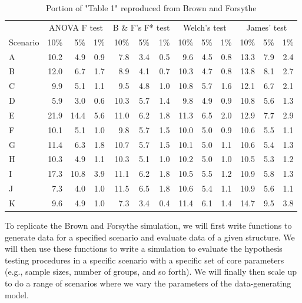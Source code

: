 \documentclass[
]{book}
\begin{document}
\begin{table}
\centering
\caption{\label{tab:BF-table1}Portion of "Table 1" reproduced from Brown and Forsythe}
\centering
\begin{tabular}[t]{l|r|r|r|r|r|r|r|r|r|r|r|r}
\hline
\multicolumn{1}{c|}{ } & \multicolumn{3}{c|}{ANOVA F test} & \multicolumn{3}{c|}{B \& F's F* test} & \multicolumn{3}{c|}{Welch's test} & \multicolumn{3}{c}{James' test} \\
\cline{2-4} \cline{5-7} \cline{8-10} \cline{11-13}
Scenario & 10\% & 5\% & 1\% & 10\% & 5\% & 1\% & 10\% & 5\% & 1\% & 10\% & 5\% & 1\%\\
\hline
A & 10.2 & 4.9 & 0.9 & 7.8 & 3.4 & 0.5 & 9.6 & 4.5 & 0.8 & 13.3 & 7.9 & 2.4\\
\hline
B & 12.0 & 6.7 & 1.7 & 8.9 & 4.1 & 0.7 & 10.3 & 4.7 & 0.8 & 13.8 & 8.1 & 2.7\\
\hline
C & 9.9 & 5.1 & 1.1 & 9.5 & 4.8 & 1.0 & 10.8 & 5.7 & 1.6 & 12.1 & 6.7 & 2.1\\
\hline
D & 5.9 & 3.0 & 0.6 & 10.3 & 5.7 & 1.4 & 9.8 & 4.9 & 0.9 & 10.8 & 5.6 & 1.3\\
\hline
E & 21.9 & 14.4 & 5.6 & 11.0 & 6.2 & 1.8 & 11.3 & 6.5 & 2.0 & 12.9 & 7.7 & 2.9\\
\hline
F & 10.1 & 5.1 & 1.0 & 9.8 & 5.7 & 1.5 & 10.0 & 5.0 & 0.9 & 10.6 & 5.5 & 1.1\\
\hline
G & 11.4 & 6.3 & 1.8 & 10.7 & 5.7 & 1.5 & 10.1 & 5.0 & 1.1 & 10.6 & 5.4 & 1.3\\
\hline
H & 10.3 & 4.9 & 1.1 & 10.3 & 5.1 & 1.0 & 10.2 & 5.0 & 1.0 & 10.5 & 5.3 & 1.2\\
\hline
I & 17.3 & 10.8 & 3.9 & 11.1 & 6.2 & 1.8 & 10.5 & 5.5 & 1.2 & 10.9 & 5.8 & 1.3\\
\hline
J & 7.3 & 4.0 & 1.0 & 11.5 & 6.5 & 1.8 & 10.6 & 5.4 & 1.1 & 10.9 & 5.6 & 1.1\\
\hline
K & 9.6 & 4.9 & 1.0 & 7.3 & 3.4 & 0.4 & 11.4 & 6.1 & 1.4 & 14.7 & 9.5 & 3.8\\
\hline
\end{tabular}
\end{table}

To replicate the Brown and Forsythe simulation, we will first write functions to generate data for a specified scenario and evaluate data of a given structure.
We will then use these functions to write a simulation to evaluate the hypothesis testing procedures in a specific scenario with a specific set of core parameters (e.g., sample sizes, number of groups, and so forth). We will finally then scale up to do a range of scenarios where we vary the parameters of the data-generating model.
\end{document}
